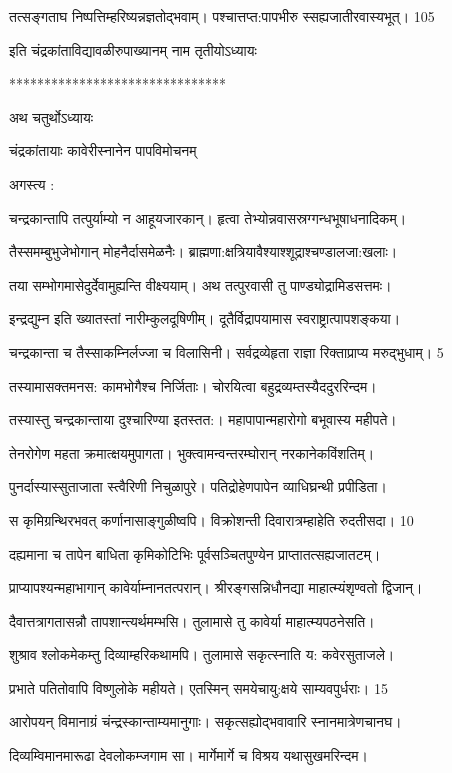 तत्सङ्गताघ निष्पत्तिम्हरिष्यन्नज्ञतोद्भवाम्।
पश्चात्तप्त:पापभीरु स्सह्यजातीरवास्यभूत्। 105

इति चंद्रकांताविद्यावळीरुपाख्यानम् नाम तृतीयोऽध्यायः

*******************************

अथ चतुर्थोऽध्यायः

चंद्रकांतायाः कावेरीस्नानेन पापविमोचनम्

अगस्त्य :

चन्द्रकान्तापि तत्पुर्याम्यो न आहूयजारकान्।
हृत्वा तेभ्योन्नवासस्रग्गन्धभूषाधनादिकम्।

तैस्समम्बुभुजेभोगान् मोहनैर्दासमेळनैः।
ब्राह्मणा:क्षत्रियावैश्याश्शूद्राश्चण्डालजा:खलाः।

तया सम्भोगमासेदुर्देवामुह्यन्ति वीक्ष्ययाम्।
अथ तत्पुरवासी तु पाण्ड्योद्रामिडसत्तमः।

इन्द्रद्युम्न इति ख्यातस्तां नारीम्कुलदूषिणीम्।
दूतैर्विद्रापयामास स्वराष्ट्रात्पापशङ्कया।

चन्द्रकान्ता च तैस्साकम्निर्लज्जा च विलासिनी।
सर्वद्रव्येहृता राज्ञा रिक्ताप्राप्य मरुद्भुधाम्। 5

तस्यामासक्तमनस: कामभोगैश्च निर्जिताः।
चोरयित्वा बहुद्रव्यम्तस्यैददुररिन्दम।


तस्यास्तु चन्द्रकान्ताया दुश्चारिण्या इतस्तत:।
महापापान्महारोगो बभूवास्य महीपते।

तेनरोगेण महता क्रमात्क्षयमुपागता।
भुक्त्वामन्वन्तरम्घोरान् नरकानेकविंशतिम्।

पुनर्दास्यास्सुताजाता स्त्वैरिणी निचुळापुरे।
पतिद्रोहेणपापेन व्याधिघ्रन्थी प्रपीडिता।

स कृमिग्रन्थिरभवत् कर्णानासाङ्गुळीष्वपि।
विक्रोशन्ती दिवारात्रम्हाहेति रुदतीसदा। 10

दह्यमाना च तापेन बाधिता कृमिकोटिभिः
पूर्वसञ्चितपुण्येन प्राप्तातत्सह्यजातटम्।

प्राप्यापश्यन्महाभागान् कावेर्याम्नानतत्परान्।
श्रीरङ्गसन्निधौनद्या माहात्म्यंशृण्वतो द्विजान्।

दैवात्तत्रागतासन्नौ तापशान्त्यर्थमम्भसि।
तुलामासे तु कावेर्या माहात्म्यपठनेसति।

शुश्राव श्लोकमेकम्तु दिव्याम्हरिकथामपि।
तुलामासे सकृत्स्नाति य: कवेरसुताजले।

प्रभाते पतितोवापि विष्णुलोके महीयते।
एतस्मिन् समयेचायु:क्षये साम्यवपुर्धराः। 15

आरोपयन् विमानाग्रं चंन्द्रस्कान्ताम्यमानुगाः।
सकृत्सह्योद्भवावारि स्नानमात्रेणचानघ।

दिव्यम्विमानमारूढा देवलोकम्जगाम सा।
मार्गेमार्गे च विश्रय यथासुखमरिन्दम।


